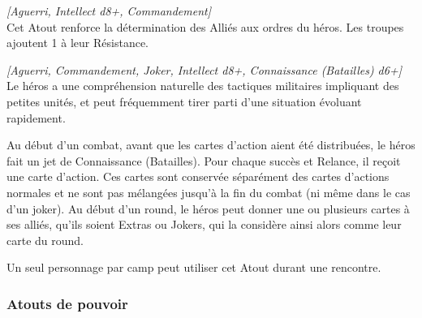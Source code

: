\begin{description}[align=left]
    \item [Serrez les rangs !]
    	\emph{[Aguerri, Intellect d8+, Commandement]}\\
        Cet Atout renforce la détermination des Alliés aux ordres du héros. Les troupes ajoutent 1 à leur Résistance.

    \item [Tacticien]
    	\emph{[Aguerri, Commandement, Joker, Intellect d8+, Connaissance (Batailles) d6+]}\\
        Le héros a une compréhension naturelle des tactiques militaires impliquant des petites unités, et peut fréquemment tirer parti d’une situation évoluant rapidement.

        Au début d’un combat, avant que les cartes d’action aient été distribuées, le héros fait un jet de Connaissance (Batailles). Pour chaque succès et Relance, il reçoit une carte d’action. Ces cartes sont conservée séparément des cartes d’actions normales et ne sont pas mélangées jusqu’à la fin du combat (ni même dans le cas d’un joker). Au début d’un round, le héros peut donner une ou plusieurs cartes à ses alliés, qu’ils soient Extras ou Jokers, qui la considère ainsi alors comme leur carte du round.

        Un seul personnage par camp peut utiliser cet Atout durant une rencontre.

\end{description}

\newpage
\subsubsection{Atouts de pouvoir}

